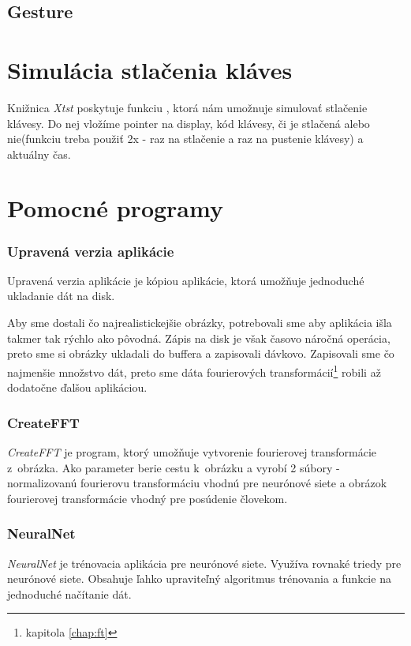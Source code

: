 \todo

\subsection{Gesture}

\todo

\section{Simulácia stlačenia kláves}
Knižnica \textit{Xtst} poskytuje funkciu , ktorá nám umožnuje simulovať stlačenie klávesy. Do nej vložíme pointer na display, kód klávesy, či je stlačená alebo nie(funkciu treba použiť 2x - raz na stlačenie a raz na pustenie klávesy) a aktuálny čas.

\section{Pomocné programy}

\subsubsection{Upravená verzia aplikácie}
\label{chap:saveimageapp}
Upravená verzia aplikácie je kópiou aplikácie, ktorá umožňuje jednoduché ukladanie dát na disk.

Aby sme dostali čo najrealistickejšie obrázky, potrebovali sme aby aplikácia išla takmer tak rýchlo ako pôvodná. Zápis na disk je však časovo náročná operácia, preto sme si obrázky ukladali do buffera a zapisovali dávkovo. Zapisovali sme čo najmenšie množstvo dát, preto sme dáta fourierových transformácií\footnote{kapitola \ref{chap:ft} } robili až dodatočne ďalšou aplikáciou.

\subsubsection{CreateFFT}

\textit{CreateFFT} je program, ktorý umožňuje vytvorenie fourierovej transformácie z~obrázka. Ako parameter berie cestu k~obrázku a vyrobí 2 súbory - normalizovanú fourierovu transformáciu vhodnú pre neurónové siete a obrázok fourierovej transformácie vhodný pre posúdenie človekom.

\todo

\subsubsection{NeuralNet}
\textit{NeuralNet} je trénovacia aplikácia pre neurónové siete. Využíva rovnaké triedy pre neurónové siete. Obsahuje ľahko upraviteľný algoritmus trénovania a funkcie na jednoduché načítanie dát. 


